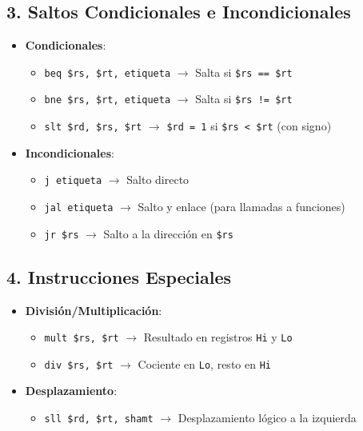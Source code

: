 \documentclass{article}
\begin{document}
\subsection*{3. Saltos Condicionales e Incondicionales}
\begin{itemize}
    \item \textbf{Condicionales}:
    \begin{itemize}
        \item \verb|beq $rs, $rt, etiqueta| $\rightarrow$ Salta si \verb|$rs == $rt|
        \item \verb|bne $rs, $rt, etiqueta| $\rightarrow$ Salta si \verb|$rs != $rt|
        \item \verb|slt $rd, $rs, $rt| $\rightarrow$ \verb|$rd = 1| si \verb|$rs < $rt| (con signo)
    \end{itemize}
    
    \item \textbf{Incondicionales}:
    \begin{itemize}
        \item \verb|j etiqueta| $\rightarrow$ Salto directo
        \item \verb|jal etiqueta| $\rightarrow$ Salto y enlace (para llamadas a funciones)
        \item \verb|jr $rs| $\rightarrow$ Salto a la dirección en \verb|$rs|
    \end{itemize}
\end{itemize}

\subsection*{4. Instrucciones Especiales}
\begin{itemize}
    \item \textbf{División/Multiplicación}:
    \begin{itemize}
        \item \verb|mult $rs, $rt| $\rightarrow$ Resultado en registros \verb|Hi| y \verb|Lo|
        \item \verb|div $rs, $rt| $\rightarrow$ Cociente en \verb|Lo|, resto en \verb|Hi|
    \end{itemize}
    
    \item \textbf{Desplazamiento}:
    \begin{itemize}
        \item \verb|sll $rd, $rt, shamt| $\rightarrow$ Desplazamiento lógico a la izquierda
    \end{itemize}
\end{itemize}
\end{document}
